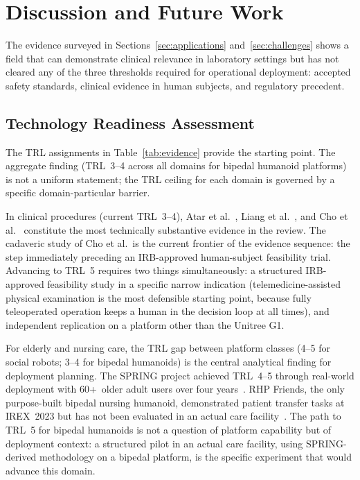 \documentclass[acmjour]{acmart}
\begin{document}
\section{Discussion and Future Work}
\label{sec:discussion}

The evidence surveyed in Sections~\ref{sec:applications} and~\ref{sec:challenges}
shows a field that can demonstrate clinical relevance in laboratory settings but
has not cleared any of the three thresholds required for operational deployment:
accepted safety standards, clinical evidence in human subjects, and regulatory
precedent.

\subsection{Technology Readiness Assessment}
\label{sec:trl}

The TRL assignments in Table~\ref{tab:evidence} provide the starting point. The
aggregate finding (TRL~3--4 across all domains for bipedal humanoid
platforms) is not a uniform statement; the TRL ceiling for each domain is
governed by a specific domain-particular barrier.

In clinical procedures (current TRL~3--4), Atar et
al.~\cite{atar2025humanoids}, Liang et al.~\cite{liang2025lapsurgie}, and Cho et
al.~\cite{cho2026humanoid} constitute the most technically substantive evidence
in the review. The cadaveric study of Cho et al.\ is the current frontier of the
evidence sequence: the step immediately preceding an IRB-approved human-subject
feasibility trial. Advancing to TRL~5 requires two things simultaneously: a
structured IRB-approved feasibility study in a specific narrow indication
(telemedicine-assisted physical examination is the most defensible starting point,
because fully teleoperated operation keeps a human in the decision loop at all
times), and independent replication on a platform other than the Unitree G1.

For elderly and nursing care, the TRL gap between platform classes
(4--5 for social robots; 3--4 for bipedal humanoids) is the central
analytical finding for deployment planning. The SPRING project achieved TRL~4--5
through real-world deployment with 60+~older
adult users over four years~\cite{alamedapineda2024spring}. RHP
Friends, the only purpose-built bipedal nursing humanoid, demonstrated patient
transfer tasks at IREX~2023 but has not been evaluated in an actual care
facility~\cite{benallegue2025rhp}. The path to TRL~5 for bipedal humanoids is
not a question of platform capability but of deployment context: a structured
pilot in an actual care facility, using SPRING-derived methodology on a bipedal
platform, is the specific experiment that would advance this domain.
\end{document}
